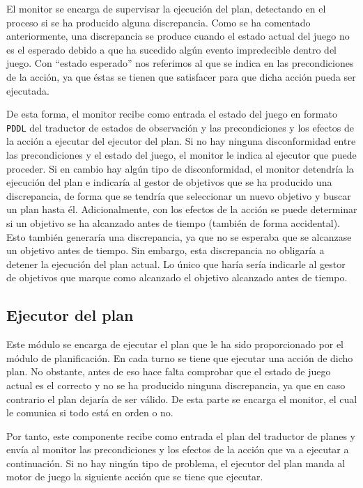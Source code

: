 El monitor se encarga de supervisar la ejecución del plan, detectando en el proceso si se ha producido
alguna discrepancia. Como se ha comentado anteriormente, una discrepancia se produce cuando el estado
actual del juego no es el esperado debido a que ha sucedido algún evento impredecible dentro del juego.
Con ``estado esperado'' nos referimos al que se indica en las precondiciones de la acción, ya que
éstas se tienen que satisfacer para que dicha acción pueda ser ejecutada.

De esta forma, el monitor recibe como entrada el estado del juego en formato \texttt{PDDL} del
traductor de estados de observación y las precondiciones y los efectos de la acción a ejecutar
del ejecutor del plan. Si no hay ninguna disconformidad entre las precondiciones y el estado del juego,
el monitor le indica al ejecutor que puede proceder. Si en cambio hay algún tipo de disconformidad,
el monitor detendría la ejecución del plan e indicaría al gestor de objetivos que se ha producido
una discrepancia, de forma que se tendría que seleccionar un nuevo objetivo y buscar un plan hasta
él. Adicionalmente, con los efectos de la acción se puede determinar si un objetivo se ha alcanzado
antes de tiempo (también de forma accidental). Esto también generaría una discrepancia, ya que no se
esperaba que se alcanzase un objetivo antes de tiempo. Sin embargo, esta discrepancia no obligaría
a detener la ejecución del plan actual. Lo único que haría sería indicarle al gestor de objetivos
que marque como alcanzado el objetivo alcanzado antes de tiempo.

\subsection{Ejecutor del plan}

Este módulo se encarga de ejecutar el plan que le ha sido proporcionado por el módulo de planificación.
En cada turno se tiene que ejecutar una acción de dicho plan. No obstante, antes de eso hace falta
comprobar que el estado de juego actual es el correcto y no se ha producido ninguna discrepancia, ya
que en caso contrario el plan dejaría de ser válido. De esta parte se encarga el monitor, el cual
le comunica si todo está en orden o no.

Por tanto, este componente recibe como entrada el plan del traductor de planes y envía al monitor
las precondiciones y los efectos de la acción que va a ejecutar a continuación. Si no hay ningún
tipo de problema, el ejecutor del plan manda al motor de juego la siguiente acción que se
tiene que ejecutar.
